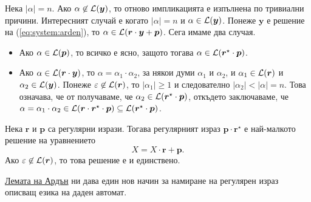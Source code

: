 \begin{hint}
\begin{itemize}
    Нека $|\alpha| = n$. Ако $\alpha \not\in \mathcal{L}(\bm{y})$, то отново импликацията е изпълнена по
    тривиални причини.
    Интересният случай е когато $|\alpha| = n$ и $\alpha \in \mathcal{L}(\bm{y})$.
    Понеже $\bm{y}$ е решение на (\ref{eq:system:arden}), то $\alpha \in \mathcal{L}(\bm{r} \cdot \bm{y} + \bm{p})$. Сега имаме два случая.
    \begin{itemize}
    \item
      Ако $\alpha \in \mathcal{L}(\bm{p})$, то всичко е ясно, защото тогава $\alpha \in \mathcal{L}(\bm{r}^\star \cdot \bm{p})$.
    \item
      Ако $\alpha\in\mathcal{L}(\bm{r}\cdot \bm{y})$, то $\alpha = \alpha_1 \cdot \alpha_2 $, за някои думи $\alpha_1$ и $\alpha_2$, и $\alpha_1 \in \mathcal{L}(\bm{r})$ и $\alpha_2 \in \mathcal{L}(\bm{y})$.
      Понеже $\varepsilon \not\in\mathcal{L}(\bm{r})$, то $|\alpha_1| \geq 1$ и следователно $|\alpha_2| < |\alpha| = n$. Това означава, че от \IndHyp получаваме, че $\alpha_2 \in \mathcal{L}(\bm{r}^\star\cdot \bm{p})$,
    откъдето заключаваме, че $\alpha = \alpha_1 \cdot \alpha_2 \in \mathcal{L}(\bm{r} \cdot \bm{r}^\star \cdot \bm{p}) \subseteq \mathcal{L}(\bm{r}^\star \cdot \bm{p})$.
    \end{itemize}
  \end{itemize}
\end{hint}

\begin{problem}
  Нека $\bm{r}$  и $\bm{p}$ са регулярни изрази.
  Тогава регулярният израз $\bm{p} \cdot \bm{r}^\star$ е най-малкото решение на уравнението
  \[X = X \cdot \bm{r} + \bm{p}.\]
  Ако $\varepsilon  \not \in \mathcal{L}(\bm{r})$, то това решение е и единствено.
\end{problem}

\hyperref[lem:regular:system:arden]{Лемата на Ардън} ни дава един нов начин за намиране на регулярен израз описващ езика на даден автомат.

